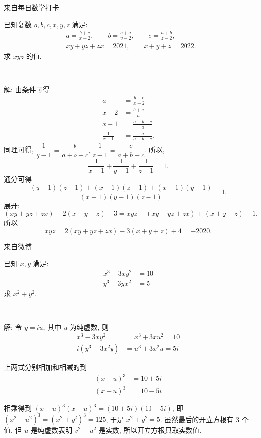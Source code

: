 \newpage
\noindent 来自每日数学打卡

已知复数 $a,b,c,x,y,z$ 满足:
\begin{align*}
& a = \frac{b+c}{x-2}, \qquad b = \frac{c+a}{y-2},\qquad c = \frac{a+b}{z-2},\\
& xy+yz+zx = 2021,\qquad x+y+z=2022.
\end{align*}
求 $xyz$ 的值.

~

解: 由条件可得
\begin{align*}
a &= \frac{b+c}{x-2}\\
x-2 &= \frac{b+c}{a}\\
x-1 &= \frac{a+b+c}{a}\\
\frac{1}{x-1} &= \frac{a}{a+b+c}.
\end{align*}
同理可得, $\dfrac{1}{y-1} = \dfrac{b}{a+b+c}, \dfrac{1}{z-1} = \dfrac{c}{a+b+c}$.
所以, 
\[\frac{1}{x-1} + \frac{1}{y-1}+\frac{1}{z-1} = 1.\]
通分可得
\[\frac{(y-1)(z-1)+(x-1)(z-1)+(x-1)(y-1)}{(x-1)(y-1)(z-1)} = 1.\]
展开:
\[ (xy + yz + zx) - 2(x+y+z) + 3 = xyz - (xy+yz+zx) + (x+y+z) - 1.\]
所以
\[xyz = 2(xy+yz+zx) - 3(x+y+z) + 4 = -2020.\]

\newpage
\noindent 来自微博

已知 $x,y$ 满足:
\begin{align*}
x^3-3xy^2&=10\\
y^3-3yx^2&=5
\end{align*}
求 $x^2+y^2$.

~

解: 令 $y = iu$, 其中 $u$ 为纯虚数, 则 
\begin{align*} 
x^3-3xy^2 &= x^3+3xu^2=10\\
i(y^3-3x^2y) &= u^3+3x^2u=5i
\end{align*}

上两式分别相加和相减的到
\begin{align*}
(x+u)^3 & =10+5i\\
(x-u)^3 &= 10-5i
\end{align*}

相乘得到 $(x+u)^3(x-u)^3=(10+5i)(10-5i)$, 即 $(x^2-u^2)^3=(x^2+y^2)^3=125$, 于是 $x^2+y^2=5$. 虽然最后的开立方根有 3 个值, 但 $u$ 是纯虚数表明 $x^2-u^2$ 是实数, 所以开立方根只取实数值.


\newpage

